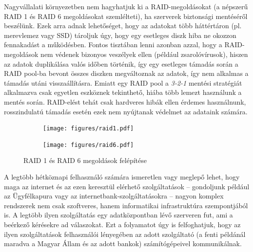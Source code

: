 Nagyvállalati környezetben nem hagyhatjuk ki a RAID-megoldásokat (a népszerű RAID 1 és RAID 6 megoldásokat  szemlélteti), ha szerverek biztonsági mentéséről beszélünk. Ezek arra adnak lehetőséget, hogy az adatokat több háttértáron (pl. merevlemez vagy SSD) tároljuk úgy, hogy egy esetleges diszk hiba ne okozzon fennakadást a működésben. Fontos tisztában lenni azonban azzal, hogy a RAID-megoldások nem védenek bizonyos veszélyek ellen (például zsarolóvírusok), hiszen az adatok duplikálása valós időben történik, így egy esetleges támadás során a RAID pool-ba bevont összes diszken megváltoznak az adatok, így nem alkalmas a támadás utáni visszaállításra. Emiatt egy RAID pool a \textit{3-2-1} mentési stratégiát alkalmazva csak egyetlen eszköznek tekinthető, hiába több lemezt használunk a mentés során. RAID-elést tehát csak hardveres hibák ellen érdemes használnunk, rosszindulatú támadás esetén ezek nem nyújtanak védelmet az adataink számára.

\begin{figure}[!ht]
	
	\centering
	\begin{subfigure}{0.3\textwidth}
		\centering
		\texttt{[image: figures/raid1.pdf]}
	\end{subfigure}
	\hspace{0.05\textwidth}
	\begin{subfigure}{0.6\textwidth}
		\centering
		\texttt{[image: figures/raid6.pdf]}
	\end{subfigure}
	\caption{RAID 1 és RAID 6 megoldások felépítése \cite{WikiRaidLevels}}
	\label{fig:raid}
\end{figure}


A legtöbb hétköznapi felhasználó számára ismeretlen vagy meglepő lehet, hogy maga az internet és az ezen keresztül elérhető szolgáltatások -- gondoljunk például az Ügyfélkapura vagy az internetbank-szolgáltatásokra -- nagyon komplex rendszerek nem csak szoftveres, hanem informatikai infrastruktúra szempontjából is. A legtöbb ilyen szolgáltatás egy adatközpontban lévő szerveren fut, ami a beérkező kérésekre ad válaszokat. Ezt a folyamatot úgy is felfoghatjuk, hogy az ilyen szolgáltatások felhasználói lényegében az adott szolgáltató (a fenti példánál maradva a Magyar Állam és az adott bankok) számítógépeivel kommunikálnak.

